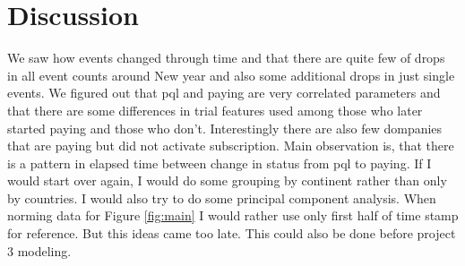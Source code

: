 \documentclass[fleqn,moreauthors,10pt]{ds_report}
\begin{document}

\section*{Discussion}

We saw how events changed through time and that there are quite few of drops in all event counts around New year and also some additional drops in just single events. We figured out that pql and paying are very correlated parameters and that there are some differences in trial features used among those who later started paying and those who don't. Interestingly there are also few dompanies that are paying but did not activate subscription. Main observation is, that there is a pattern in elapsed time between change in status from pql to paying. If I would start over again, I would do some grouping by continent rather than only by countries.  I would also try to do some principal component analysis. When norming data for Figure \ref{fig:main} I would rather use only first half of time stamp for reference. But this ideas came too late. This could also be done before project 3 modeling. 








%
%
\end{document}
